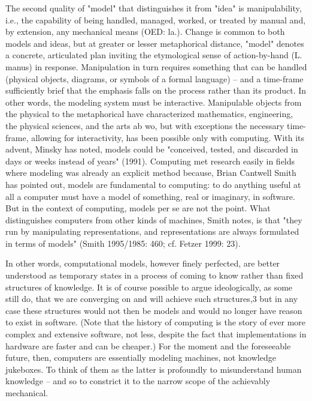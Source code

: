The second quality of "model" that distinguishes it from "idea" is manipulability, i.e., the capability of being handled, managed, worked, or treated by manual and, by extension, any mechanical means (OED: la.). Change is common to both models and ideas, but at greater or lesser metaphorical distance, "model" denotes a concrete, articulated plan inviting the etymological sense of action-by-hand (L. manus) in response. Manipulation in turn requires something that can be handled (physical objects, diagrams, or symbols of a formal language) – and a time-frame sufficiently brief that the emphasis falls on the process rather than its product. In other words, the modeling system must be interactive. Manipulable objects from the physical to the metaphorical have characterized mathematics, engineering, the physical sciences, and the arts ab wo, but with exceptions the necessary time-frame, allowing for interactivity, has been possible only with computing. With its advent, Minsky has noted, models could be "conceived, tested, and discarded in days or weeks instead of years" (1991). Computing met research easily in fields where modeling was already an explicit method because, Brian Cantwell Smith has pointed out, models are fundamental to computing: to do anything useful at all a computer must have a model of something, real or imaginary, in software. But in the context of computing, models per se are not the point. What distinguishes computers from other kinds of machines, Smith notes, is that "they run by manipulating representations, and representations are always formulated in terms of models" (Smith 1995/1985: 460; cf. Fetzer 1999: 23).

In other words, computational models, however finely perfected, are better understood as temporary states in a process of coming to know rather than fixed structures of knowledge. It is of course possible to argue ideologically, as some still do, that we are converging on and will achieve such structures,3 but in any case these structures would not then be models and would no longer have reason to exist in software. (Note that the history of computing is the story of ever more complex and extensive software, not less, despite the fact that implementations in hardware are faster and can be cheaper.) For the moment and the foreseeable future, then, computers are essentially modeling machines, not knowledge jukeboxes. To think of them as the latter is profoundly to misunderstand human knowledge – and so to constrict it to the narrow scope of the achievably mechanical.

